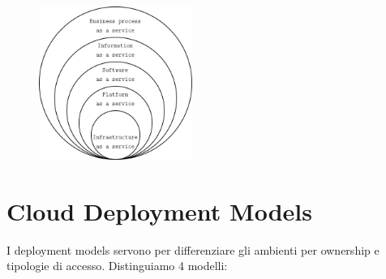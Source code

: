\begin{figure}[h!]
    \centering
    \includegraphics[width=5cm]{./Images/cap3/3.7.png}
\end{figure}

\newpage


\break
\section{Cloud Deployment Models}
I deployment models servono per differenziare gli ambienti per ownership e tipologie di accesso. Distinguiamo 4 modelli:
